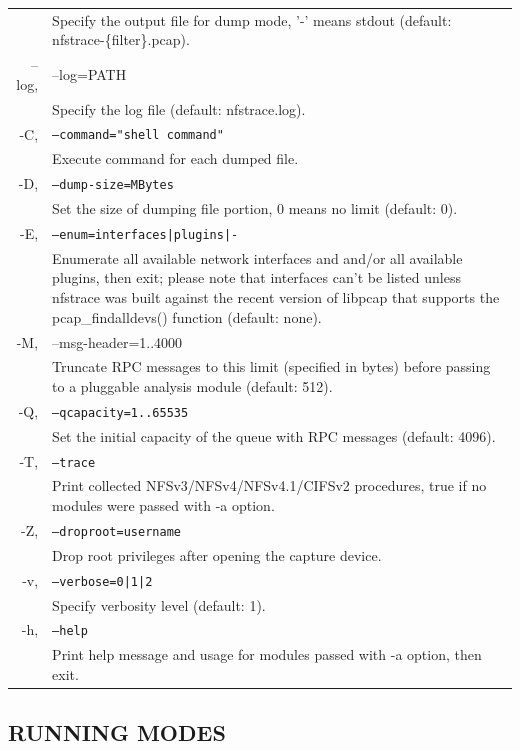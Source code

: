\documentclass{article}
\newcommand*{\textfile}[1]{\textsf{#1}}
\newcommand*{\textprog}[1]{\textfile{#1}}
\newcommand{\code}[1]{\texttt{#1}}
\begin{document}
\begin{tabularx}{\linewidth}{ r X }
& Specify the output file for dump mode, '-' means stdout (default:
nfstrace-\{filter\}.pcap).\\ 
\textprog{--log}, & --log=PATH\\ & Specify the log file (default: nfstrace.log).\\
\textprog{-C}, & \code{--command="shell command"} \\
& Execute command for each dumped file.\\
\textprog{-D}, & \code{--dump-size=MBytes}\\
& Set the size of dumping file portion, 0 means no limit (default: 0).\\
\textprog{-E}, & \code{--enum=interfaces|plugins|-}\\
& Enumerate all available network interfaces and and/or all available plugins,
then exit; please note that interfaces can't be listed unless \textprog{nfstrace} was
built against the recent version of libpcap that supports the
pcap\_findalldevs() function (default: none).\\ 
\textprog{-M}, &
\textprog{--msg-header=1..4000}\\
& Truncate RPC messages to this limit (specified in bytes) before passing to a
pluggable analysis module (default: 512).\\
\textprog{-Q}, & \code{--qcapacity=1..65535}\\
& Set the initial capacity of the queue with RPC messages (default: 4096).\\
\textprog{-T}, & \code{--trace}\\
& Print collected NFSv3/NFSv4/NFSv4.1/CIFSv2 procedures, true if no modules were
passed with -a option.\\
\textprog{-Z}, & \code{--droproot=username}\\
& Drop root privileges after opening the capture device.\\
\textprog{-v}, & \code{--verbose=0|1|2}\\
& Specify verbosity level (default: 1).\\
\textprog{-h}, & \code{--help}\\
& Print help message and usage for modules passed with -a option, then exit.\\
\end{tabularx} 

\subsection{RUNNING MODES}
\end{document}
